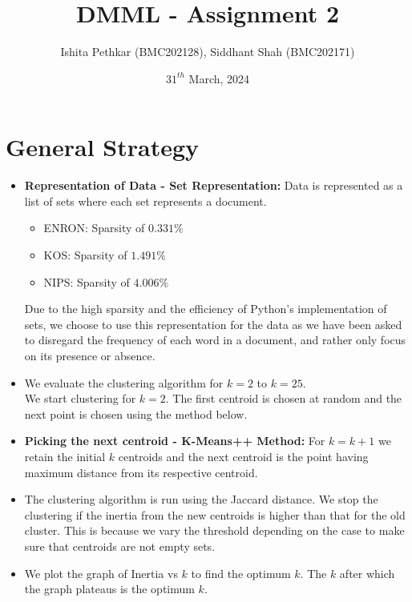 \documentclass[10pt]{article}
\title{DMML - Assignment 2}
\author{Ishita Pethkar (BMC202128), Siddhant Shah (BMC202171)}
\date{$31^{th}$ March, 2024}
\begin{document}
\thispagestyle{empty}
\maketitle


\section{General Strategy}
\begin{itemize}
    \item \textbf{Representation of Data - Set  Representation:}
    Data is represented as a list of sets where each set represents a document.
        \begin{itemize}
            \item ENRON: Sparsity of $0.331 \%$
            \item KOS: Sparsity of $1.491 \%$
            \item NIPS: Sparsity of $4.006 \%$
        \end{itemize}
        Due to the high sparsity and the efficiency of Python's implementation of sets, we choose to use this representation for the data as we have been asked to disregard the frequency of each word in a document, and rather only focus on its presence or absence.
    \item We evaluate the clustering algorithm for $k = 2$ to $k = 25$. \\
    We start clustering for $k = 2$. The first centroid is chosen at random and the next point is chosen using the method below. 
    \item \textbf{Picking the next centroid - K-Means++ Method:} For $k = k+1$ we retain the initial $k$ centroids and the next centroid is the point having maximum distance from its respective centroid.
    \item The clustering algorithm is run using the Jaccard distance. We stop the clustering if the inertia from the new centroids is higher than that for the old cluster. This is because we vary the threshold depending on the case to make sure that centroids are not empty sets.
    \item We plot the graph of Inertia vs $k$ to find the optimum $k$. The $k$ after which the graph plateaus is the optimum $k$.
\end{itemize}
\end{document}
